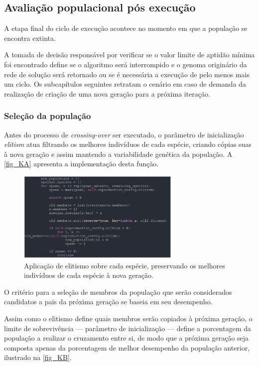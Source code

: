 \subsection{Avaliação populacional pós execução}
A etapa final do ciclo de execução acontece no momento em que a população se encontra extinta.

A tomada de decisão responsável por verificar se o valor limite de aptidão mínima foi encontrado
define se o algoritmo será interrompido e o genoma originário da rede de solução será retornado
ou se é necessária a execução de pelo menos mais um ciclo. Os subcapítulos seguintes retratam o cenário
em caso de demanda da realização de criação de uma nova geração para a próxima iteração.

\subsubsection{Seleção da população}
Antes do processo de \textit{crossing-over} ser executado, o parâmetro de inicialização
\textit{elitism} atua filtrando os melhores indivíduos de cada espécie, criando cópias suas
à nova geração e assim mantendo a variabilidade genética da população. A \autoref{fig_KA} apresenta a implementação desta função.

\begin{figure}[htb]
        \centering
        \caption{\label{fig_KA}Aplicação de elitismo sobre cada espécie, preservando os melhores indivíduos de cada espécie à nova geração.}
        \includegraphics[width=0.7\textwidth]{images/KA.png}
\end{figure}

O critério para a seleção de membros da população que serão considerados candidatos a pais da próxima geração se baseia em seu desempenho.

Assim como o elitismo define quais membros serão copiados à próxima geração, o limite de sobrevivência
— parâmetro de inicialização — define a porcentagem da população a realizar o cruzamento entre si,
de modo que a próxima geração seja composta apenas da porcentagem de melhor desempenho da população anterior, ilustrado na \autoref{fig_KB}.

